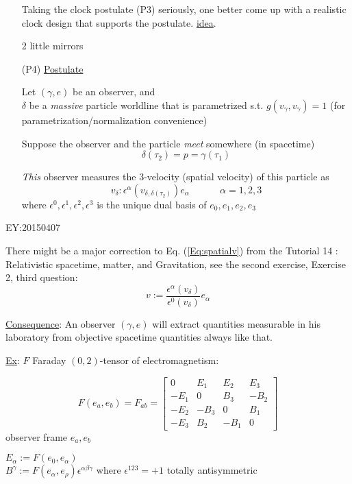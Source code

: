 \begin{enumerate}
Taking the clock postulate (P3) seriously, one better come up with a realistic clock design that supports the postulate. 
\underline{idea}.

2 little mirrors
\item[(P4)] \underline{Postulate}

Let $(\gamma, e)$ be an observer, and \\
$\delta$ be a \emph{massive} particle worldline that is parametrized s.t. $g(v_{\gamma}, v_{\gamma})=1$ (for parametrization/normalization convenience)

Suppose the observer and the particle \emph{meet} somewhere (in spacetime)
\[
\delta(\tau_2) = p = \gamma(\tau_1)
\]

\emph{This} observer measures the 3-velocity (spatial velocity) of this particle as 
\begin{equation}\label{Eq:spatialv}
v_{\delta}: \epsilon^{\alpha}( v_{\delta, \delta(\tau_2)} ) e_{\alpha} \quad \quad \quad \, \alpha =1,2,3
\end{equation}
where $\epsilon^0, \boxed{ \epsilon^1,\epsilon^2,\epsilon^3}$ is the unique dual basis of $e_0,\boxed{ e_1,e_2,e_3}$
\end{enumerate}

EY:20150407

There might be a major correction to Eq. (\ref{Eq:spatialv}) from the Tutorial 14 : Relativistic spacetime, matter, and Gravitation, see the second exercise, Exercise 2, third question:
\begin{equation}
v := \frac{ \epsilon^{\alpha}({v}_{\delta} ) }{ \epsilon^0({v}_{\delta}) } e_{\alpha}
\end{equation}

\underline{Consequence}:
An observer $(\gamma, e)$ will extract quantities measurable in his laboratory from objective spacetime quantities always like that.

\underline{Ex}: $F$ Faraday $(0,2)$-tensor of electromagnetism:

\[
F(e_a,e_b) = F_{ab} = \left[ \begin{matrix} 0 & E_1 & E_2 & E_3 \\ 
    -E_1 & 0 & B_3 & -B_2 \\ 
    -E_2 & -B_3 & 0 & B_1 \\
    -E_3 & B_2 & -B_1 & 0 \end{matrix} \right]
\]
observer frame $e_a,e_b$

$E_{\alpha} := F(e_0,e_{\alpha})$ \\
$B^{\gamma}:= F(e_{\alpha},e_{\rho})\epsilon^{\alpha \beta \gamma}$
where 
$\epsilon^{123} = +1$ totally antisymmetric

